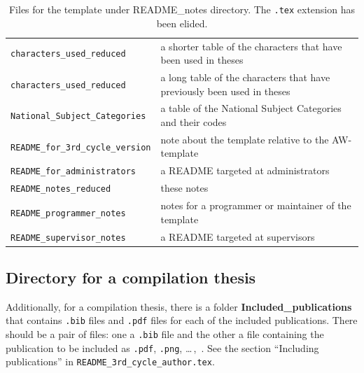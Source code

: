 \documentclass[12pt, twoside]{article}
\newcommand{\dname}[1]{\textbf{#1}}
\newcommand{\fname}[1]{\texttt{#1}}
\begin{document}
\begin{table}[!ht]
    \caption[Files for the template under README\_notes]{Files for the template under README\_notes directory. The \fname{.tex} extension has been elided.}
    \label{tab:file_structure_readme_notes}
    \begin{tabular}{L{7.5cm}<{\footnotesize} L{5.5cm}}
\hline
\fname{characters\_used\_reduced} & a shorter table of the characters that have been used in theses\\
\fname{characters\_used\_reduced} & a long table of the characters that have previously been used in theses\\
\fname{National\_Subject\_Categories} & a table of the National Subject Categories and their codes \\
\fname{README\_for\_3rd\_cycle\_version} & note about the template relative to the AW-template \\
\fname{README\_for\_administrators} & a README targeted at administrators \\
\fname{README\_notes\_reduced} & these notes \\
\fname{README\_programmer\_notes} & notes for a programmer or maintainer of the template\\
\fname{README\_supervisor\_notes} & a README targeted at supervisors \\
\end{tabular}
\end{table}

\subsection{Directory for a compilation thesis}
Additionally, for a compilation thesis, there is a folder \dname{Included\_publications} that contains \fname{.bib} files and \fname{.pdf} files for each of the included publications. There should be a pair of files: one a \fname{.bib} file and the other a file containing the publication to be included as \fname{.pdf}, \fname{.png}, \ldots\,,\ .
See the section \enquote{Including publications} in  \fname{README\_3rd\_cycle\_author.tex}.

\end{document}
